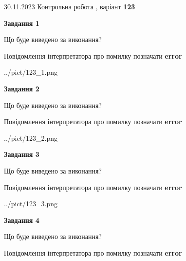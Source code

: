\documentclass[12pt, ukrainian]{article}
\begin{document}
{{30.11.2023 Контрольна робота , варіант  \No \textbf { 123 }\par}}
{




{\begin {center}\textbf{Завдання 1}\end {center}}\par
Що буде виведено за виконання? \par
Повідомлення інтерпретатора про помилку позначати \textbf{error}

\begin{center}
	{../pict/123_1.png}
\end{center}
\newpage

{\begin {center}\textbf{Завдання 2}\end {center}}\par
Що буде виведено за виконання? \par
Повідомлення інтерпретатора про помилку позначати \textbf{error}

\begin{center}
	{../pict/123_2.png}
\end{center}
\newpage

{\begin {center}\textbf{Завдання 3}\end {center}}\par
Що буде виведено за виконання? \par
Повідомлення інтерпретатора про помилку позначати \textbf{error}

\begin{center}
	{../pict/123_3.png}
\end{center}
\newpage

{\begin {center}\textbf{Завдання 4}\end {center}}\par
Що буде виведено за виконання? \par
Повідомлення інтерпретатора про помилку позначати \textbf{error}

}
\end{document}
